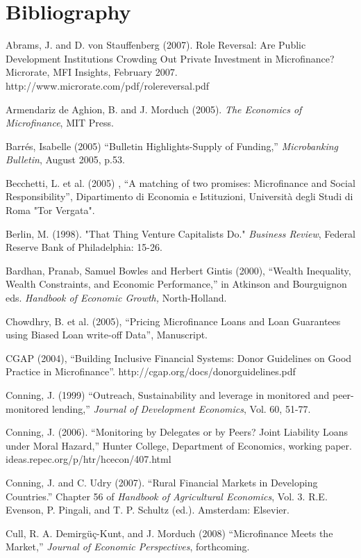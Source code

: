 \documentclass{article} %
\begin{document}
\noindent 
\section{Bibliography}

Abrams, J. and D. von Stauffenberg (2007). Role Reversal: Are Public Development Institutions Crowding Out Private Investment in Microfinance? Microrate, MFI Insights, February 2007. http://www.microrate.com/pdf/rolereversal.pdf 

Armendariz de Aghion, B. and J. Morduch (2005). \textit{The Economics of Microfinance}, MIT Press. 

Barr\'{e}s, Isabelle (2005) ``Bulletin Highlights-Supply of Funding,'' \textit{Microbanking Bulletin}, August 2005, p.53. 

Becchetti, L. et al. (2005) , ``A matching of two promises: Microfinance and Social Responsibility'', Dipartimento di Economia e Istituzioni, Universit\`{a} degli Studi di Roma "Tor Vergata". 

Berlin, M. (1998). "That Thing Venture Capitalists Do." \textit{Business Review}, Federal Reserve Bank of Philadelphia: 15-26. 

Bardhan, Pranab, Samuel Bowles and Herbert Gintis (2000), ``Wealth Inequality, Wealth Constraints, and Economic Performance,'' in Atkinson and Bourguignon eds. \textit{Handbook of Economic Growth,} North-Holland. 

Chowdhry, B. et al. (2005), ``Pricing Microfinance Loans and Loan Guarantees using Biased Loan write-off Data'', Manuscript. 

CGAP (2004), ``Building Inclusive Financial Systems: Donor Guidelines on Good Practice in Microfinance''. http://cgap.org/docs/donorguidelines.pdf 

Conning, J. (1999) ``Outreach, Sustainability and leverage in monitored and peer-monitored lending,'' \textit{Journal of Development Economics}, Vol. 60, 51-77. 

Conning, J. (2006). ``Monitoring by Delegates or by Peers? Joint Liability Loans under Moral Hazard,'' Hunter College, Department of Economics, working paper. ideas.repec.org/p/htr/hcecon/407.html 

Conning, J. and C. Udry (2007). ``Rural Financial Markets in Developing Countries.'' Chapter 56 of \textit{Handbook of Agricultural Economics}, Vol. 3.  R.E. Evenson, P. Pingali, and T. P. Schultz (ed.).  Amsterdam: Elsevier.

Cull, R. A. Demirg\"{u}\c{c}-Kunt, and J. Morduch (2008) ``Microfinance Meets the Market,'' \textit{Journal of Economic Perspectives}, forthcoming.
\end{document}
